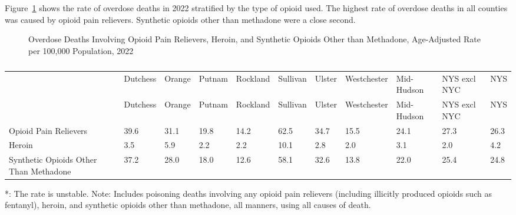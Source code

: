 \documentclass[
  english,
  letterpaper,
]{report}
\begin{document}
Figure~\ref{fig-od-multiple-opioid-aar} shows the rate of overdose
deaths in 2022 stratified by the type of opioid used. The highest rate
of overdose deaths in all counties was caused by opioid pain relievers.
Synthetic opioids other than methadone were a close second.

\begin{figure}


\caption{\label{fig-od-multiple-opioid-aar}Overdose Deaths Involving
Opioid Pain Relievers, Heroin, and Synthetic Opioids Other than
Methadone, Age-Adjusted Rate per 100,000 Population, 2022}

\end{figure}%

\begin{longtable}[]{@{}lllllllllll@{}}

\caption{\label{tbl-od-multiple-opioid-aar}Overdose Deaths Involving
Opioid Pain Relievers, Heroin, and Synthetic Opioids Other than
Methadone, Age-Adjusted Rate per 100,000 Population, 2022}

\tabularnewline

\caption{}\label{T_a4fbd}\tabularnewline
\toprule\noalign{}
& Dutchess & Orange & Putnam & Rockland & Sullivan & Ulster &
Westchester & Mid-Hudson & NYS excl NYC & NYS \\
\midrule\noalign{}
\endfirsthead
\toprule\noalign{}
& Dutchess & Orange & Putnam & Rockland & Sullivan & Ulster &
Westchester & Mid-Hudson & NYS excl NYC & NYS \\
\midrule\noalign{}
\endhead
\bottomrule\noalign{}
\endlastfoot
Opioid Pain Relievers & 39.6 & 31.1 & 19.8 & 14.2 & 62.5 & 34.7 & 15.5 &
24.1 & 27.3 & 26.3 \\
Heroin & 3.5 & 5.9 & 2.2 & 2.2 & 10.1 & 2.8 & 2.0 & 3.1 & 2.0 & 4.2 \\
Synthetic Opioids Other Than Methadone & 37.2 & 28.0 & 18.0 & 12.6 &
58.1 & 32.6 & 13.8 & 22.0 & 25.4 & 24.8 \\

\end{longtable}

\begin{tcolorbox}[enhanced jigsaw, breakable, leftrule=.75mm, title=\textcolor{quarto-callout-note-color}{\faInfo}\hspace{0.5em}{Note}, bottomrule=.15mm, opacityback=0, left=2mm, colback=white, bottomtitle=1mm, coltitle=black, colbacktitle=quarto-callout-note-color!10!white, colframe=quarto-callout-note-color-frame, opacitybacktitle=0.6, toptitle=1mm, titlerule=0mm, arc=.35mm, rightrule=.15mm, toprule=.15mm]

*: The rate is unstable. Note: Includes poisoning deaths involving any
opioid pain relievers (including illicitly produced opioids such as
fentanyl), heroin, and synthetic opioids other than methadone, all
manners, using all causes of death.

\end{tcolorbox}
\end{document}
